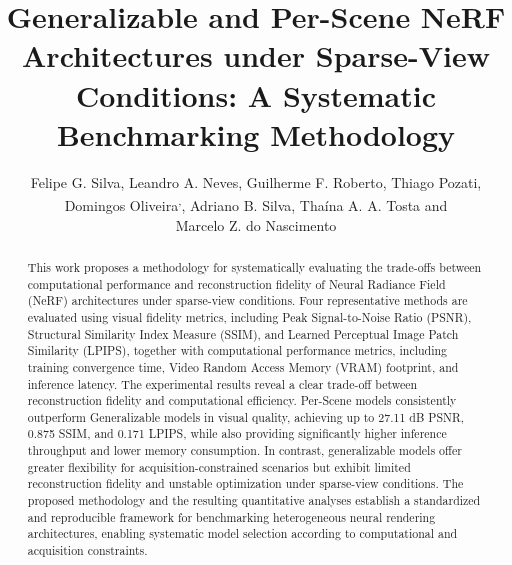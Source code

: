 \documentclass[12pt]{article}
\title{Generalizable and Per-Scene NeRF Architectures under Sparse-View Conditions: A Systematic Benchmarking Methodology}
\author{
Felipe G. Silva\inst{1},
Leandro A. Neves\inst{1},
Guilherme F. Roberto\inst{1},
Thiago Pozati\inst{1},\\
Domingos Oliveira\inst{2}\textsuperscript{,}\inst{3},
Adriano B. Silva\inst{3},
Tha\'ina A. A. Tosta\inst{4} and\\
Marcelo Z. do Nascimento\inst{3}
}
\begin{document}
\maketitle

\begin{abstract}
This work proposes a methodology for systematically evaluating the trade-offs between computational performance and reconstruction fidelity of Neural Radiance Field (NeRF) architectures under sparse-view conditions. Four representative methods are evaluated using visual fidelity metrics, including Peak Signal-to-Noise Ratio (PSNR), Structural Similarity Index Measure (SSIM), and Learned Perceptual Image Patch Similarity (LPIPS), together with computational performance metrics, including training convergence time, Video Random Access Memory (VRAM) footprint, and inference latency. The experimental results reveal a clear trade-off between reconstruction fidelity and computational efficiency. Per-Scene models consistently outperform Generalizable models in visual quality, achieving up to 27.11 dB PSNR, 0.875 SSIM, and 0.171 LPIPS, while also providing significantly higher inference throughput and lower memory consumption. In contrast, generalizable models offer greater flexibility for acquisition-constrained scenarios but exhibit limited reconstruction fidelity and unstable optimization under sparse-view conditions. The proposed methodology and the resulting quantitative analyses establish a standardized and reproducible framework for benchmarking heterogeneous neural rendering architectures, enabling systematic model selection according to computational and acquisition constraints.
\end{abstract}













\end{document}
